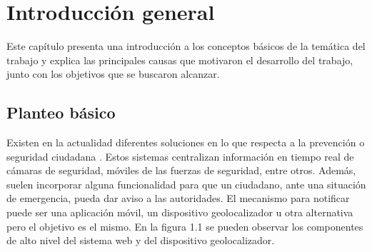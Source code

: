 
\chapter{Introducción general} %

\label{Chapter1} %
\label{IntroGeneral}


\newcommand{\keyword}[1]{\textbf{#1}}
\newcommand{\tabhead}[1]{\textbf{#1}}
\newcommand{\code}[1]{\texttt{#1}}
\newcommand{\file}[1]{\texttt{\bfseries#1}}
\newcommand{\option}[1]{\texttt{\itshape#1}}
\newcommand{\grados}{$^{\circ}$}



Este capítulo presenta una introducción a los conceptos básicos de la temática del trabajo y explica las principales causas que motivaron el desarrollo del trabajo, junto con los objetivos que se buscaron alcanzar.

\section{Planteo básico}

Existen en la actualidad diferentes soluciones en lo que respecta a la prevención o seguridad ciudadana \citep{PNUD:1}. Estos sistemas centralizan información en tiempo real de cámaras de seguridad, móviles de las fuerzas de seguridad, entre otros. Además, suelen incorporar alguna funcionalidad para que un ciudadano, ante una situación de emergencia, pueda dar aviso a las autoridades. El mecanismo para notificar puede ser una aplicación móvil, un dispositivo geolocalizador u otra alternativa pero el objetivo es el mismo. En la figura 1.1 se pueden observar los componentes de alto nivel del sistema web y del dispositivo geolocalizador.

